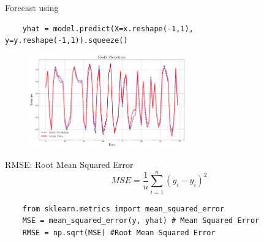 \documentclass[aspectratio=169,hyperref={pdfpagelabels=false}]{beamer}
\begin{document}
\begin{frame}[fragile]{Forecast  using  }
  \begin{verbatim}
    yhat = model.predict(X=x.reshape(-1,1), y=y.reshape(-1,1)).squeeze()
  \end{verbatim}
  \begin{figure}
    \centering
    \includegraphics[width=0.6\textwidth]{img/response_yhat.pdf}
  \end{figure}
  
\end{frame}

\begin{frame}[fragile]{RMSE: Root Mean Squared Error}
  \begin{equation}
      MSE = \frac{1}{n} \sum_{i=1}^{n} (y_i - \hat{y}_i)^2
  \end{equation}
  \begin{verbatim}
    from sklearn.metrics import mean_squared_error
    MSE = mean_squared_error(y, yhat) # Mean Squared Error
    RMSE = np.sqrt(MSE) #Root Mean Squared Error
  \end{verbatim}
\end{frame}
\end{document}
